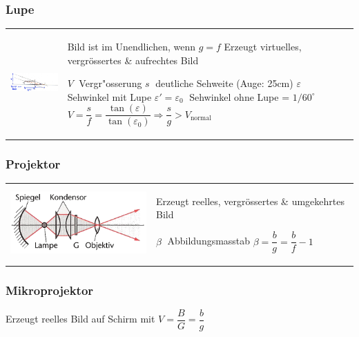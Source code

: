 \subsubsection{Lupe  }
\begin{tabular}{lll}
  \parbox{7cm}{\includegraphics[width=7cm]{./bilder/lupe.png}} &
  \parbox{11cm}{
    Bild ist im Unendlichen, wenn $g=f$\\
    Erzeugt virtuelles, vergrössertes \& aufrechtes Bild \\
    \\
    $V \;$ Vergr"osserung \qquad \qquad $s \;$ deutliche Sehweite (Auge: 25cm)\\
    \qquad $\varepsilon \;$ Sehwinkel mit Lupe \qquad $\varepsilon' = \varepsilon_0 \;$ Sehwinkel
    ohne Lupe = $1/60^\circ$\\
    $V=\dfrac{s}{f}=\dfrac{\tan(\varepsilon)}{\tan(\varepsilon_0)}\Rightarrow\dfrac{s}{g}>
    V_{\text{normal}}$ }
\end{tabular}
\subsubsection{Projektor }
\begin{tabular}{ll}
\parbox{6cm}{
  \includegraphics[width=6cm]{./bilder/projektor.png}} &
\parbox{12cm}{
  Erzeugt reelles, vergrössertes \& umgekehrtes Bild \\
  \\
  $\beta \;$ Abbildungsmasstab \\
  $\beta = \dfrac{b}{g} = \dfrac{b}{f}-1$}
\end{tabular}

\subsubsection{Mikroprojektor} 
Erzeugt reelles Bild auf Schirm mit $V=\dfrac{B}{G}=\dfrac{b}{g}$\\

